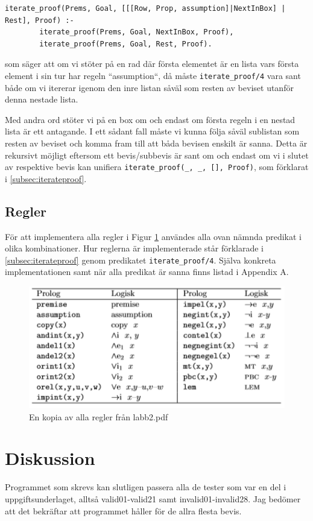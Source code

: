 \documentclass[a4paper]{article}
\begin{document}
\begin{verbatim}
iterate_proof(Prems, Goal, [[[Row, Prop, assumption]|NextInBox] | Rest], Proof) :-
        iterate_proof(Prems, Goal, NextInBox, Proof),
        iterate_proof(Prems, Goal, Rest, Proof).
\end{verbatim}
som säger att om vi stöter på en rad där första elementet är en lista vars första element i sin tur har regeln ``assumption``, då måste \texttt{iterate_proof/4} vara sant både om vi itererar igenom den inre listan såväl som resten av beviset utanför denna nestade lista. 

Med andra ord stöter vi på en box om och endast om första regeln i en nestad lista är ett antagande. I ett sådant fall måste vi kunna följa såväl sublistan som resten av beviset och komma fram till att båda bevisen enskilt är sanna. Detta är rekursivt möjligt eftersom ett bevis/subbevis är sant om och endast om vi i slutet av respektive bevis kan unifiera \texttt{iterate_proof(_, _, [], Proof)}, som förklarat i \ref{subsec:iterateproof}.

\subsection{Regler}
För att implementera alla regler i Figur \ref{fig:ruletable} användes alla ovan nämnda predikat i olika kombinationer. Hur reglerna är implementerade står förklarade i \ref{subsec:iterateproof} genom predikatet \texttt{iterate_proof/4}. Själva konkreta implementationen samt när alla predikat är sanna finns listad i Appendix A.

\begin{figure}[!h]
  \includegraphics[]{ruletable.png}
  \caption{En kopia av alla regler från labb2.pdf}
  \label{fig:ruletable}
\end{figure}

\section{Diskussion}
Programmet som skrevs kan slutligen passera alla de tester som var en del i uppgiftsunderlaget, alltså valid01-valid21 samt invalid01-invalid28. Jag bedömer att det bekräftar att programmet håller för de allra flesta bevis. 
\end{document}
